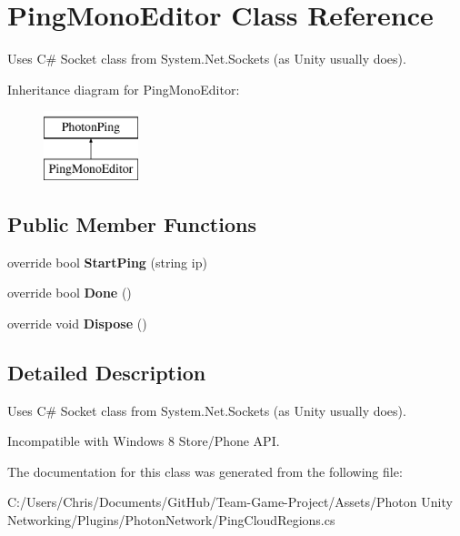 \hypertarget{class_ping_mono_editor}{}\section{Ping\+Mono\+Editor Class Reference}
\label{class_ping_mono_editor}


Uses C\# Socket class from System.\+Net.\+Sockets (as Unity usually does).  


Inheritance diagram for Ping\+Mono\+Editor\+:\begin{figure}[H]
\begin{center}
\leavevmode
\includegraphics[height=2.000000cm]{class_ping_mono_editor}
\end{center}
\end{figure}
\subsection*{Public Member Functions}
\begin{DoxyCompactItemize}
\item 
override bool {\bfseries Start\+Ping} (string ip)\hypertarget{class_ping_mono_editor_a2e854f702a4ced545a5b4405a511941e}{}\label{class_ping_mono_editor_a2e854f702a4ced545a5b4405a511941e}

\item 
override bool {\bfseries Done} ()\hypertarget{class_ping_mono_editor_a4bcf82f6d83763d40da8a8b91a602245}{}\label{class_ping_mono_editor_a4bcf82f6d83763d40da8a8b91a602245}

\item 
override void {\bfseries Dispose} ()\hypertarget{class_ping_mono_editor_ae09a896c196c491b286e42b4bae1b5ff}{}\label{class_ping_mono_editor_ae09a896c196c491b286e42b4bae1b5ff}

\end{DoxyCompactItemize}


\subsection{Detailed Description}
Uses C\# Socket class from System.\+Net.\+Sockets (as Unity usually does). 

Incompatible with Windows 8 Store/\+Phone A\+PI.

The documentation for this class was generated from the following file\+:\begin{DoxyCompactItemize}
\item 
C\+:/\+Users/\+Chris/\+Documents/\+Git\+Hub/\+Team-\/\+Game-\/\+Project/\+Assets/\+Photon Unity Networking/\+Plugins/\+Photon\+Network/Ping\+Cloud\+Regions.\+cs\end{DoxyCompactItemize}
